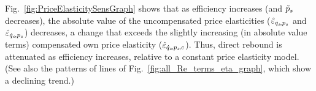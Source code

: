 \documentclass[12pt]{article}\usepackage[]{graphicx}\usepackage[]{xcolor}
\begin{document}
Fig.~\ref{fig:PriceElasticitySensGraph} shows that
as efficiency increases (and $\tilde{p}_s$ decreases), 
the absolute value of the uncompensated price elasticities 
($\hat{\varepsilon}_{\dot{q}_s\!,p_s}$ and $\hat{\varepsilon}_{\dot{q}_o\!,p_s}$) decreases, 
a change that exceeds the slightly increasing (in absolute value terms)
compensated own price elasticity ($\hat{\varepsilon}_{\dot{q}_s\!,p_s\!,c}$). 
Thus, direct rebound is attenuated as efficiency increases,
relative to a constant price elasticity model.
(See also the patterns of lines of Fig.~\ref{fig:all_Re_terms_eta_graph},
which show a declining trend.)
\end{document}
